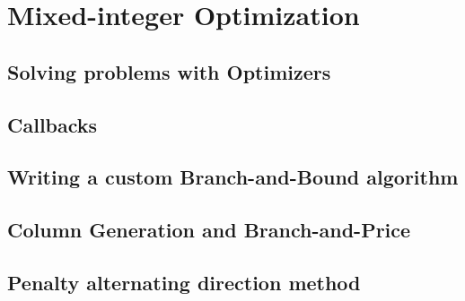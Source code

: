 \part{Mixed-integer Optimization}



\chapter{Solving problems with \textsf{Optimizers}}

\chapter{Callbacks}

\chapter{Writing a custom Branch-and-Bound algorithm}

\chapter{Column Generation and Branch-and-Price}

\chapter{Penalty alternating direction method}
